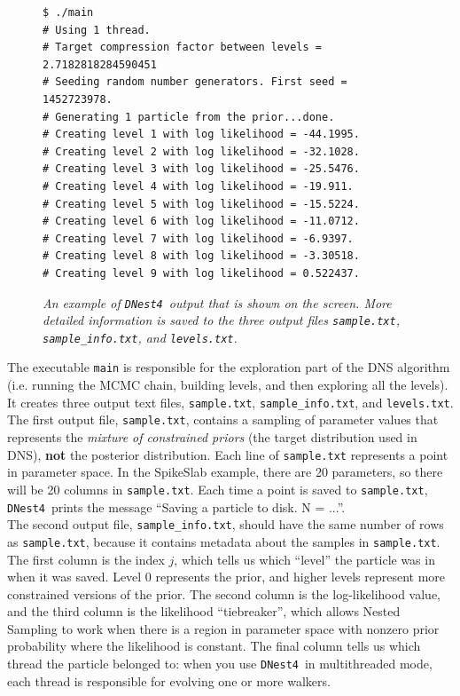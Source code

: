 \documentclass[a4paper, 11pt]{article}
\newcommand{\dnest}{{\tt DNest4}}
\begin{document}
\begin{figure}[h!]
\begin{framed}
\begin{verbatim}
$ ./main
# Using 1 thread.
# Target compression factor between levels = 2.7182818284590451
# Seeding random number generators. First seed = 1452723978.
# Generating 1 particle from the prior...done.
# Creating level 1 with log likelihood = -44.1995.
# Creating level 2 with log likelihood = -32.1028.
# Creating level 3 with log likelihood = -25.5476.
# Creating level 4 with log likelihood = -19.911.
# Creating level 5 with log likelihood = -15.5224.
# Creating level 6 with log likelihood = -11.0712.
# Creating level 7 with log likelihood = -6.9397.
# Creating level 8 with log likelihood = -3.30518.
# Creating level 9 with log likelihood = 0.522437.
\end{verbatim}
\end{framed}
\caption{\it An example of \dnest~output that is shown on the screen. More
detailed information is saved to the three output files
{\tt sample.txt}, {\tt sample\_info.txt}, and {\tt levels.txt}.
\label{fig:output}}
\end{figure}

The executable {\tt main} is responsible for the exploration part of the
DNS algorithm (i.e. running the MCMC chain, building
levels, and then exploring all the levels). It creates three output text files,
{\tt sample.txt}, {\tt sample\_info.txt}, and {\tt levels.txt}.\\

The first output
file, {\tt sample.txt}, contains a sampling of parameter values that
represents the {\it mixture of constrained priors} (the target distribution
used in DNS), {\bf not} the
posterior distribution. Each line of {\tt sample.txt} represents a point in
parameter space. In the SpikeSlab example, there are 20 parameters, so there
will be 20 columns in {\tt sample.txt}.
Each time a point is saved to {\tt sample.txt}, \dnest~prints
the message ``Saving a particle to disk. N = ...''.\\

The second output file, {\tt sample\_info.txt}, should have the same number of
rows as {\tt sample.txt}, because it contains metadata about the samples in
{\tt sample.txt}. The first
column is the index $j$, which tells us which ``level'' the particle was in
when it was saved. Level 0 represents the prior, and higher levels represent
more constrained versions of the prior.
The second column is the log-likelihood value, and the third column is
the likelihood ``tiebreaker'', which allows Nested Sampling to work when
there is a region in parameter space with nonzero prior probability where the
likelihood is constant. The final column tells us which thread the particle
belonged to: when you use \dnest~in multithreaded mode, each thread
is responsible for evolving one or more walkers.\\
\end{document}

